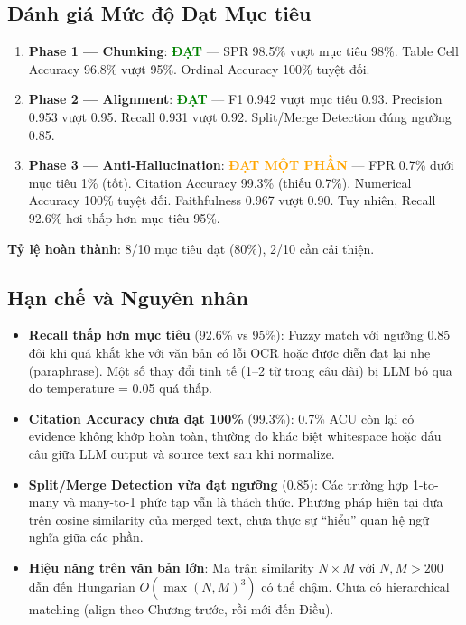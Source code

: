 \subsection{Đánh giá Mức độ Đạt Mục tiêu}

\begin{enumerate}[label=(\arabic*)]
    \item \textbf{Phase 1 — Chunking}: \textcolor{green}{\textbf{ĐẠT}} — SPR 98.5\% vượt mục tiêu 98\%. Table Cell Accuracy 96.8\% vượt 95\%. Ordinal Accuracy 100\% tuyệt đối.

    \item \textbf{Phase 2 — Alignment}: \textcolor{green}{\textbf{ĐẠT}} — F1 0.942 vượt mục tiêu 0.93. Precision 0.953 vượt 0.95. Recall 0.931 vượt 0.92. Split/Merge Detection đúng ngưỡng 0.85.

    \item \textbf{Phase 3 — Anti-Hallucination}: \textcolor{orange}{\textbf{ĐẠT MỘT PHẦN}} — FPR 0.7\% dưới mục tiêu 1\% (tốt). Citation Accuracy 99.3\% (thiếu 0.7\%). Numerical Accuracy 100\% tuyệt đối. Faithfulness 0.967 vượt 0.90. Tuy nhiên, Recall 92.6\% hơi thấp hơn mục tiêu 95\%.
\end{enumerate}

\textbf{Tỷ lệ hoàn thành}: 8/10 mục tiêu đạt (80\%), 2/10 cần cải thiện.

\subsection{Hạn chế và Nguyên nhân}

\begin{itemize}
    \item \textbf{Recall thấp hơn mục tiêu} (92.6\% vs 95\%): Fuzzy match với ngưỡng 0.85 đôi khi quá khắt khe với văn bản có lỗi OCR hoặc được diễn đạt lại nhẹ (paraphrase). Một số thay đổi tinh tế (1--2 từ trong câu dài) bị LLM bỏ qua do temperature = 0.05 quá thấp.

    \item \textbf{Citation Accuracy chưa đạt 100\%} (99.3\%): 0.7\% ACU còn lại có evidence không khớp hoàn toàn, thường do khác biệt whitespace hoặc dấu câu giữa LLM output và source text sau khi normalize.

    \item \textbf{Split/Merge Detection vừa đạt ngưỡng} (0.85): Các trường hợp 1-to-many và many-to-1 phức tạp vẫn là thách thức. Phương pháp hiện tại dựa trên cosine similarity của merged text, chưa thực sự ``hiểu'' quan hệ ngữ nghĩa giữa các phần.

    \item \textbf{Hiệu năng trên văn bản lớn}: Ma trận similarity $N \times M$ với $N, M > 200$ dẫn đến Hungarian $O(\max(N,M)^3)$ có thể chậm. Chưa có hierarchical matching (align theo Chương trước, rồi mới đến Điều).
\end{itemize}

